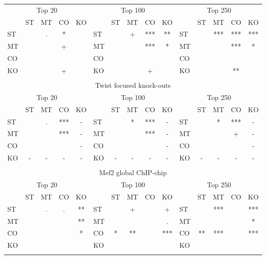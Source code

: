 \documentclass{article}
\begin{document}
\begin{longtable}[c]{lcccc|lcccc|lcccc}
\multicolumn{5}{c|}{Top 20} &\multicolumn{5}{c|}{Top 100}  & \multicolumn{5}{c}{Top 250}\\
    & ST  & MT  & CO  & KO &     & ST  & MT  & CO  & KO  &     & ST  & MT  & CO  & KO \\
ST &     & .   & *   &     & ST &     & +   & *** & **  & ST &     & *** & *** & ***\\
MT &     &     & +   &     & MT &     &     & *** & *   & MT &     &     & *** & *  \\
CO &     &     &     &     & CO &     &     &     &     & CO &     &     &     &    \\
KO &     &     & +   &     & KO &     &     & +   &     & KO &     &     & **  &    \\
\hline
\\[0mm]
\multicolumn{15}{c}{Twist focused knock-outs} \\
\multicolumn{5}{c|}{Top 20} &\multicolumn{5}{c|}{Top 100}  & \multicolumn{5}{c}{Top 250}\\
    & ST  & MT  & CO  & KO &     & ST  & MT  & CO  & KO  &     & ST  & MT  & CO  & KO \\
ST &     & .   & *** & -   & ST &     & *   & *** & -   & ST &     & *   & *** & -  \\
MT &     &     & *** & -   & MT &     &     & *** & -   & MT &     &     & +   & -  \\
CO &     &     &     & -   & CO &     &     &     & -   & CO &     &     &     & -  \\
KO & -   & -   & -   & -   & KO & -   & -   & -   & -   & KO & -   & -   & -   & -  \\
\hline
\\[0mm]
\multicolumn{15}{c}{Mef2 global ChIP-chip} \\
\multicolumn{5}{c|}{Top 20} &\multicolumn{5}{c|}{Top 100}  & \multicolumn{5}{c}{Top 250}\\
    & ST  & MT  & CO  & KO &     & ST  & MT  & CO  & KO  &     & ST  & MT  & CO  & KO \\
ST &     & .   & .   & **  & ST &     & +   &     & +   & ST &     & *** &     & ***\\
MT &     &     &     & **  & MT &     &     &     & .   & MT &     &     &     & *  \\
CO &     &     &     & *   & CO & *   & **  &     & *** & CO & **  & *** &     & ***\\
KO &     &     &     &     & KO &     &     &     &     & KO &     &     &     &    \\
\hline
\newpage

\end{longtable}
\end{document}
